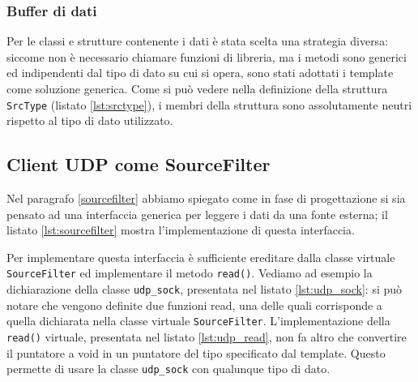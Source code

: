 \subsubsection{Buffer di dati}
Per le classi e strutture contenente i dati \`e stata scelta una strategia
diversa: siccome non \`e necessario chiamare funzioni di libreria, ma i metodi
sono generici ed indipendenti dal tipo di dato su cui si opera, sono stati
adottati i template come soluzione generica. Come si pu\`o vedere nella
definizione della struttura \texttt{SrcType} (listato \ref{lst:srctype}), i
membri della struttura sono assolutamente neutri rispetto al tipo di dato
utilizzato.



\subsection{Client UDP come SourceFilter}
Nel paragrafo \ref{sourcefilter} abbiamo spiegato come in fase di progettazione
si sia pensato ad una interfaccia generica per leggere i dati da una fonte
esterna; il listato \ref{lst:sourcefilter} mostra l'implementazione di questa
interfaccia.


Per implementare questa interfaccia \`e sufficiente ereditare dalla classe
virtuale \texttt{SourceFilter} ed implementare il metodo \texttt{read()}.
Vediamo ad esempio la dichiarazione della classe \texttt{udp\_sock}, presentata
nel listato \ref{lst:udp_sock}: si pu\`o notare che vengono definite due
funzioni read, una delle quali corrisponde a quella dichiarata nella classe
virtuale \texttt{SourceFilter}. L'implementazione della \texttt{read()}
virtuale, presentata nel listato \ref{lst:udp_read}, non fa altro che convertire
il puntatore a void in un puntatore del tipo specificato dal template. Questo
permette di usare la classe \texttt{udp\_sock} con qualunque tipo di dato.






